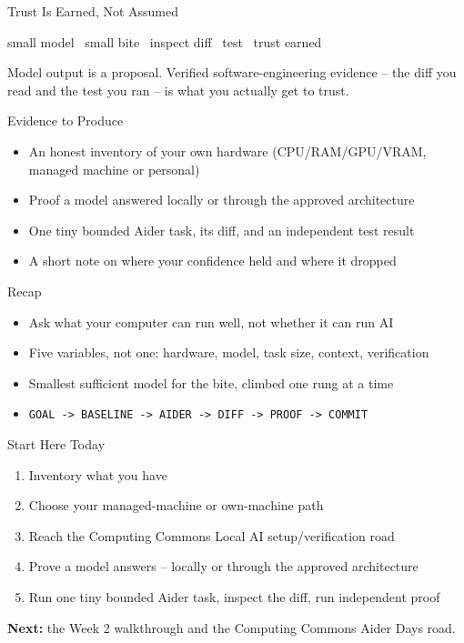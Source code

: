 \documentclass[aspectratio=169]{beamer}
\begin{document}
\begin{aimomentframe}{Trust Is Earned, Not Assumed}
  \begin{center}
    \large small model \textrightarrow\ small bite \textrightarrow\ inspect diff \textrightarrow\ test \textrightarrow\ trust earned
  \end{center}

  \vspace{2mm}
  Model output is a proposal. Verified software-engineering evidence --
  the diff you read and the test you ran -- is what you actually get to
  trust.
\end{aimomentframe}

\begin{evidenceframe}{Evidence to Produce}
  \begin{itemize}
    \item An honest inventory of your own hardware (CPU/RAM/GPU/VRAM, managed machine or personal)
    \item Proof a model answered locally or through the approved architecture
    \item One tiny bounded Aider task, its diff, and an independent test result
    \item A short note on where your confidence held and where it dropped
  \end{itemize}
\end{evidenceframe}

\begin{recapframe}{Recap}
  \begin{itemize}
    \item Ask what your computer can run well, not whether it can run AI
    \item Five variables, not one: hardware, model, task size, context, verification
    \item Smallest sufficient model for the bite, climbed one rung at a time
    \item \texttt{GOAL -> BASELINE -> AIDER -> DIFF -> PROOF -> COMMIT}
  \end{itemize}
\end{recapframe}

\begin{exitframe}{Start Here Today}
  \begin{enumerate}
    \item Inventory what you have
    \item Choose your managed-machine or own-machine path
    \item Reach the Computing Commons Local AI setup/verification road
    \item Prove a model answers -- locally or through the approved architecture
    \item Run one tiny bounded Aider task, inspect the diff, run independent proof
  \end{enumerate}

  \vspace{2mm}
  \textbf{Next:} the Week 2 walkthrough and the Computing Commons Aider Days road.
\end{exitframe}
\end{document}
